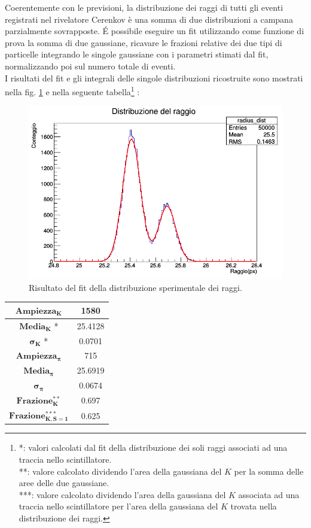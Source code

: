 \documentclass[8pt]{extarticle}
\begin{document}
Coerentemente con le previsioni, la distribuzione dei raggi di tutti gli eventi registrati nel rivelatore Cerenkov è una somma di due distribuzioni a campana parzialmente sovrapposte. \'E possibile eseguire un fit utilizzando come funzione di prova la somma di due gaussiane, ricavare le frazioni relative dei due tipi di particelle integrando le singole gaussiane con i parametri stimati dal fit, normalizzando poi sul numero totale di eventi.\\
I risultati del fit e gli integrali delle singole distribuzioni ricostruite sono mostrati nella fig. \ref{fig:bigauss_fit} e nella seguente tabella\footnote{*: valori calcolati dal fit della distribuzione dei soli raggi associati ad una traccia nello scintillatore. \\
**: valore calcolato dividendo l'area della gaussiana del $K$ per la somma delle aree delle due gaussiane. \\
***: valore calcolato dividendo l'area della gaussiana del $K$ associata ad una traccia nello scintillatore per l'area della gaussiana del $K$ trovata nella distribuzione dei raggi.} :

\begin{figure}
\begin{center}
\includegraphics[scale=0.4]{radius_dist_fitDEFINITIVO}
\caption{Risultato del fit della distribuzione sperimentale dei raggi.}
\label{fig:bigauss_fit}
\end{center}
\end{figure}

\begin{tabular}{|c|c|}
\hline 
$\mathbf{Ampiezza_K}$ & 1580 \\ 
\hline 
$\mathbf{Media_K}$ * & 25.4128 \\ 
\hline 
$\mathbf{\sigma_K}$ * & 0.0701 \\ 
\hline 
$\mathbf{Ampiezza_{\pi}}$ & 715 \\ 
\hline 
$\mathbf{Media_{\pi}}$ & 25.6919 \\ 
\hline 
$\mathbf{\sigma_{\pi}}$ & 0.0674 \\ 
\hline 
$\mathbf{Frazione_K^{**}}$ & 0.697 \\ 
\hline 
$\mathbf{Frazione_{K,S=1}^{***}}$ & 0.625 \\ 
\hline 
\end{tabular} 
\end{document}

